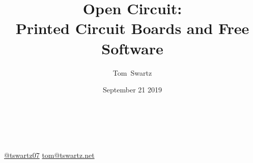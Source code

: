\documentclass[]{beamer}
\title{Open Circuit: \\Printed Circuit Boards and Free Software}
\author[Swartz]{Tom~Swartz}
\institute{Central PA Open Source Conference 2019}
\date{September 21 2019}
\begin{document}
{
\begin{frame}[plain]
    \vspace{17em}
    \begin{TitleBox}
        \begin{center}
            {\color{red}\Large\inserttitle\color{black}}\\
        \end{center}
        \insertauthor{}\hfill\insertinstitute{}\\
        {\footnotesize
        \href{http://twitter.com/tswartz07}{@tswartz07}
        \hfill
        \href{mailto: tom@tswartz.net}{tom@tswartz.net}
        }
    \end{TitleBox}
\end{frame}}
\end{document}

